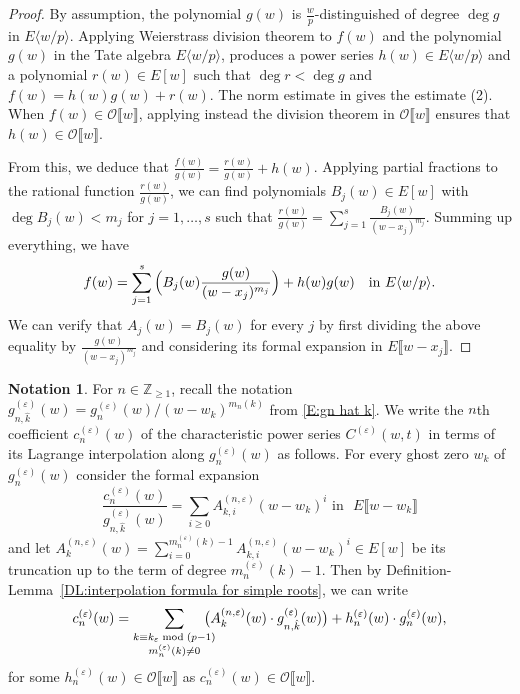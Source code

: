 \documentclass[12pt]{amsart}
\theoremstyle{definition}
\newtheorem{notation}[subsection]{Notation}
\numberwithin{equation}{subsection}
\def\calO{\mathcal{O}}
\def\ZZ{\mathbb{Z}}
\begin{document}
\begin{proof}
By assumption, the polynomial $g(w)$ is $\frac wp$-distinguished of degree $\deg g$ in $E\langle w/p \rangle$. Applying Weierstrass division theorem \cite[\S\,5.2.1, Theorem~2]{BGR-NAA} to $f(w)$ and the polynomial $g(w)$ in the Tate algebra $E\langle w/p\rangle$, produces a power series $h(w)\in E\langle w/p\rangle$ and a polynomial $r(w)\in E[w]$ such that $\deg r<\deg g$ and $f(w)=h(w)g(w)+r(w)$. The norm estimate in \cite[\S\,5.2.1, Theorem~2]{BGR-NAA} gives the estimate (2).  When $f(w)\in \calO\llbracket w\rrbracket$, applying instead the division theorem \cite[IV, Theorem~9.1]{Lang-algebra} in $\calO\llbracket w\rrbracket$ ensures that $h(w)\in \calO\llbracket w\rrbracket$.
	
From this, we deduce that $\frac{f(w)}{g(w)}=\frac{r(w)}{g(w)}+h(w)$. Applying partial fractions to the rational function $\frac{r(w)}{g(w)}$, we can find polynomials $B_j(w)\in E[w]$ with $\deg B_j(w)<m_j$ for $j=1,\dots, s$ such that $\frac{r(w)}{g(w)}=\sum\limits_{j=1}^s\frac{B_j(w)}{(w-x_j)^{m_j}}$. Summing up everything, we have
	\[
f(w)=\sum_{j=1}^s\Big(B_j(w)\frac{g(w)}{(w-x_j)^{m_j}} \Big)+h(w)g(w) \text{\quad in~}E\langle w/p\rangle.
	\]
We can verify that $A_j(w) = B_j(w)$ for every $j$ by first dividing the above equality by $\frac{g(w)}{(w-x_j)^{m_j}}$ and considering its formal expansion in $E\llbracket w-x_j\rrbracket$.
\end{proof}


\begin{notation}\label{N:Lagrange interpolation applied to c_n(w) and g_n(w)} 
For $n \in \ZZ_{\geq 1}$, recall the notation $g_{n,\hat k}^{(\varepsilon)}(w) = g_n^{(\varepsilon)}(w) / (w-w_k)^{m_n(k)}$ from \eqref{E:gn hat k}.
We write the $n$th coefficient $c_n^{(\varepsilon)}(w)$ of the characteristic power series $C^{(\varepsilon)}(w,t)$ in terms of its Lagrange interpolation along $g_n^{(\varepsilon)}(w)$ as follows. For every ghost zero $w_k$ of $g_n^{(\varepsilon)}(w)$ consider the formal expansion
\[
\frac{c_n^{(\varepsilon)}(w)}{g_{n,\hat k}^{(\varepsilon)}(w)}=\sum_{i\geq 0} A_{k,i}^{(n,\varepsilon)}(w-w_k)^i \text{~in ~}E\llbracket w-w_k\rrbracket
\]
and let $A^{(n,\varepsilon)}_k(w) =\sum\limits_{i=0}^{m^{(\varepsilon)}_n(k)-1} A^{(n,\varepsilon)}_{k,i}(w-w_k)^i \in E[w]$ be its truncation up to the term of degree $m^{(\varepsilon)}_n(k)-1$. Then by Definition-Lemma~\ref{DL:interpolation formula for simple roots}, we can write
\begin{equation}
\label{E:Lagrange interpolation cn}
c_n^{(\varepsilon)}(w) = \sum_{\substack{k \equiv k_\varepsilon \bmod{(p-1)}\\ m_n^{(\varepsilon)}(k) \neq 0 }} \hspace{-10pt}\big( A^{(n,\varepsilon)}_k(w) \cdot  g_{n,\hat k}^{(\varepsilon)}(w) \big) + h_n^{(\varepsilon)}(w) \cdot g_n^{(\varepsilon)}(w),
\end{equation}
for some $h_n^{(\varepsilon)}(w) \in \calO\llbracket w\rrbracket$ as $c_n^{(\varepsilon)}(w)\in \calO\llbracket w\rrbracket$.
\end{notation}
\end{document}
